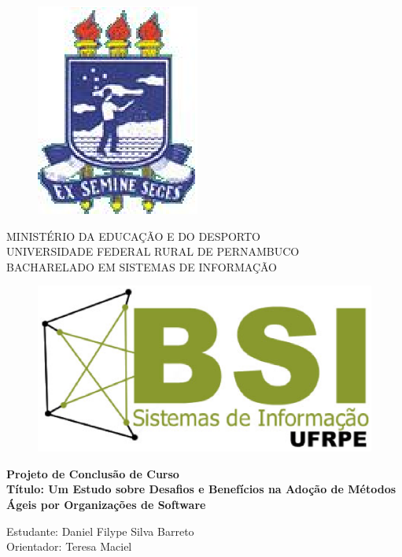 \documentclass[a4paper,11pt]{article}
\begin{document}
\pagestyle {empty}

\vspace*{-2cm}
\begin{figure}[h]
\leavevmode
\begin{minipage}[t]{\textwidth}
\includegraphics[scale=0.7]{logo-ufrpe.eps}
\end{minipage}
\end{figure}

\vspace*{-3.0cm}
{\bf
\begin{center}
{
\hspace*{0cm} 	MINISTÉRIO DA EDUCAÇÃO E DO DESPORTO \\
\hspace*{.2in} UNIVERSIDADE FEDERAL RURAL DE PERNAMBUCO \\
\hspace*{.2in} BACHARELADO EM SISTEMAS DE INFORMAÇÃO} \\
\end{center}}
\vspace{0.0cm}
\noindent
\begin{figure}[h]
\centering
\includegraphics[scale=0.5]{Logo-bsi-presencial-v3-amp.eps}
\end{figure}
\vspace*{2.0cm}
\begin{center}

{\Large \bf  Projeto de Conclusão de Curso}\\[1cm]
{\Large \bf Título: Um Estudo sobre Desafios e Benefícios na Adoção de Métodos Ágeis por Organizações de Software} \\[3cm]
\end{center}
{\Large  Estudante: Daniel Filype Silva Barreto}\\[6mm]
{\Large  Orientador: Teresa Maciel}\\[6mm]
\end{document}
